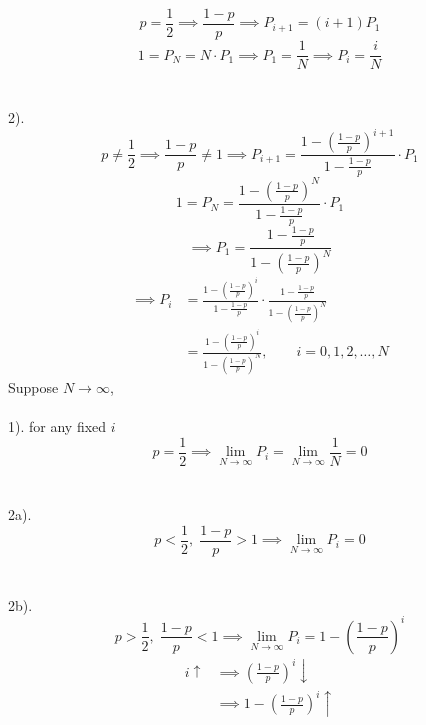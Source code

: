 \documentclass[a4paper]{article}
\begin{document}
{    \[p=\frac{1}{2}\implies\frac{1-p}{p}\implies P_{i+1}=(i+1)P_1\]
    \[1=P_N=N\cdot P_1\implies P_1=\frac{1}{N}\implies P_i=\frac{i}{N}\]
    \\\\
    2). 
    \[p\neq\frac{1}{2}\implies\frac{1-p}{p}\neq1\implies P_{i+1}=\frac{1-\left(\frac{1-p}{p}\right)^{i+1}}{1-\frac{1-p}{p}}\cdot P_1\]
    \[1=P_N=\frac{1-\left(\frac{1-p}{p}\right)^N}{1-\frac{1-p}{p}}\cdot P_1\]
    \[\implies P_1=\frac{1-\frac{1-p}{p}}{1-\left(\frac{1-p}{p}\right)^N}\]
    \begin{align*}
        \implies P_i&=\frac{1-\left(\frac{1-p}{p}\right)^i}{1-\frac{1-p}{p}}\cdot\frac{1-\frac{1-p}{p}}{1-\left(\frac{1-p}{p}\right)^N} \\
        &=\frac{1-\left(\frac{1-p}{p}\right)^i}{1-\left(\frac{1-p}{p}\right)^N}, \qquad i=0,1,2,\dots,N
    \end{align*}
    Suppose $N\rightarrow\infty$, 
    \\\\
    1). for any fixed $i$
    \[p=\frac{1}{2}\implies\lim_{N\rightarrow\infty}P_i=\lim_{N\rightarrow\infty}\frac{1}{N}=0\]
    \\\\
    2a).
    \[p<\frac{1}{2},\;\frac{1-p}{p}>1\implies\lim_{N\rightarrow\infty}P_i=0\]
    \\\\
    2b).
    \[p>\frac{1}{2},\;\frac{1-p}{p}<1\implies\lim_{N\rightarrow\infty}P_i=1-\left(\frac{1-p}{p}\right)^i\]
    \begin{align*}
        i\uparrow&\implies\left(\frac{1-p}{p}\right)^i\downarrow \\
        &\implies1-\left(\frac{1-p}{p}\right)^i\uparrow
    \end{align*}
}
\end{document}
